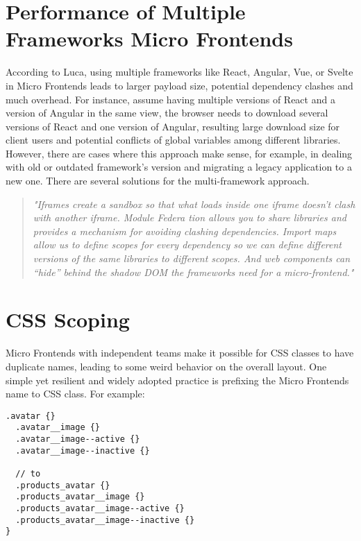 \documentclass[a4paper]{book}
\begin{document}
\section{Performance of Multiple Frameworks Micro Frontends}
According to Luca, using multiple frameworks like React, Angular, Vue, or Svelte in Micro Frontends leads to larger payload size, potential dependency clashes and much overhead. For instance, assume having multiple versions of React and a version of Angular in the same view, the browser needs to download several versions of React and one version of Angular, resulting large download size for client users and potential conflicts of global variables among different libraries. However, there are cases where this approach make sense, for example, in dealing with old or outdated framework's version and migrating a legacy application to a new one. There are several solutions for the multi-framework approach. \cite{Luc21}
\begin{quote}
    \textit{"Iframes create a
sandbox so that what loads inside one iframe doesn’t clash with another
iframe. Module Federa   tion allows you to share libraries and provides a
mechanism for avoiding clashing dependencies. Import maps allow us to
define scopes for every dependency so we can define different versions of
the same libraries to different scopes. And web components can “hide”
behind the shadow DOM the frameworks need for a micro-frontend."} \cite{Luc21}
\end{quote}

\section{CSS Scoping}
Micro Frontends with independent teams make it possible for CSS classes to have duplicate names, leading to some weird behavior on the overall layout. One simple yet resilient and widely adopted practice is prefixing the Micro Frontends name to CSS class. For example:
\begin{lstlisting}[caption={pilet-products CSS prefixing \cite{Luc21}}]
  .avatar {}
  .avatar__image {}
  .avatar__image--active {}
  .avatar__image--inactive {}
  
  // to
  .products_avatar {}
  .products_avatar__image {}
  .products_avatar__image--active {}
  .products_avatar__image--inactive {}
}
\end{lstlisting}
\end{document}
